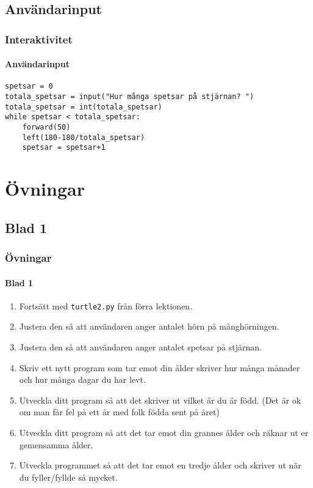 \documentclass[aspectratio=169]{beamer}
\begin{document}
\subsection{Användarinput}

\begin{frame}[fragile]
	\frametitle{Interaktivitet}
	\framesubtitle{Användarinput}
	
	\begin{lstlisting}
spetsar = 0
totala_spetsar = input("Hur många spetsar på stjärnan? ")
totala_spetsar = int(totala_spetsar)
while spetsar < totala_spetsar:
    forward(50)
    left(180-180/totala_spetsar)
    spetsar = spetsar+1
	\end{lstlisting}
	
\end{frame}

\section{Övningar}

\subsection{Blad 1}

\begin{frame}
	\frametitle{Övningar}
	\framesubtitle{Blad 1}
	
	\begin{enumerate}
		\item Fortsätt med \texttt{turtle2.py} från förra lektionen.
		\item Justera den så att användaren anger antalet hörn på månghörningen.
		\item Justera den så att användaren anger antalet spetsar på stjärnan.
		\item Skriv ett nytt program som tar emot din ålder skriver hur många månader och hur många dagar du har levt.
		\item Utveckla ditt program så att det skriver ut vilket år du är född. (Det är ok om man får fel på ett år med folk födda sent på året)
		\item Utveckla ditt program så att det tar emot din grannes ålder och räknar ut er gemensamma ålder.
		\item Utveckla programmet så att det tar emot en tredje ålder och skriver ut när du fyller/fyllde så mycket.
	\end{enumerate}

\end{frame}
\end{document}
